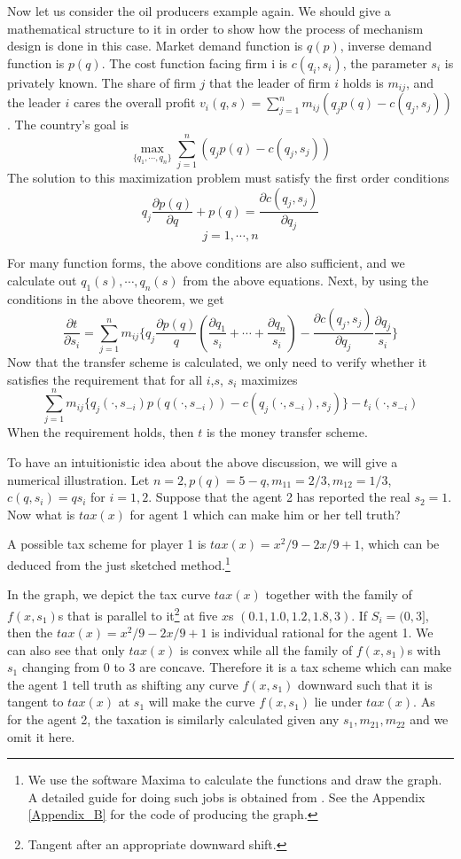 Now let us consider the oil producers example again. We should give a mathematical structure to it in order to show how the process of mechanism
design is done in this case. Market demand function is $q(p)$, inverse demand function is $p(q)$. The cost function 
facing firm i is $c(q_i,s_i)$, the parameter $s_i$ is privately known. The share of firm $j$
that the leader of firm  $i$ holds is $m_{ij}$, and  the leader $i$ cares the overall profit 
$v_i(q,s)=\sum_{j=1}^{n} m_{ij}(q_jp(q)-c(q_j,s_j))$. The country's goal is 
$$\max_{\{q_1,\cdots,q_n\}}\sum_{j=1}^{n} (q_jp(q)-c(q_j,s_j)) $$
The solution to this maximization problem must satisfy the first order conditions
$$q_j \frac {\partial p(q)}{\partial q}+p(q)=\frac {\partial c(q_j,s_j)}{\partial q_j}$$
$$j=1,\cdots,n$$

For many function forms, the above conditions are also sufficient, and we calculate out ${q_1(s),\cdots,q_n(s)}$ from the above 
equations. Next, by using the conditions in the above theorem, we get 
$$\frac{\partial t}{\partial s_i} = \sum_{j=1}^{n} m_{ij}\{q_j\frac {\partial p(q)}{q}(\frac{\partial q_1}{s_i}+\cdots+\frac{\partial q_n}{s_i})-\frac {\partial c(q_j,s_j)}{\partial q_j}\frac{\partial q_j}{s_i}\}$$
Now that the transfer scheme is calculated, we only need to verify whether it satisfies the requirement that for all $i$,$s$,  $s_i$ maximizes  
$$\sum_{j=1}^{n} m_{ij}\{q_j(\cdot,s_{-i})p(q(\cdot,s_{-i}))-c(q_j(\cdot,s_{-i}),s_j)\}-t_i(\cdot,s_{-i})$$
When the requirement holds, then $t$ is the money transfer scheme.

To have an intuitionistic idea about the above discussion, we will give a numerical illustration. Let $n=2,p(q)=5-q, m_{11}=2/3,m_{12}=1/3$, $c(q,s_i)=qs_i$ for $i=1,2$. Suppose that the agent 2 has reported the real $s_2=1$. Now what is $tax(x)$ for agent 1 which can make him or her tell truth?

A possible tax scheme for player 1 is $tax(x)=x^2/9 - 2x/9 + 1$, which can be deduced from the just sketched method.\footnote{We use the software Maxima to calculate the functions and draw the graph. A detailed guide for doing such jobs is obtained from \parencite{Maxima}.
  See the Appendix \ref{Appendix_B} for the code of producing the graph.}

In the graph, we depict the tax curve $tax(x)$ together with the family of $f(x,s_1)$s that is parallel to it\footnote{Tangent after an appropriate downward shift.} at five $x$s  $(0.1,1.0,1.2,1.8,3)$. If $S_i= (0,3]$, then the $tax(x)=x^2/9 - 2x/9 + 1$ is individual rational for the agent 1. We can also see that only $tax(x)$ is convex while all the family of $f(x,s_1)$s with $s_1$ changing from $0$ to $3$ are concave. Therefore it is a tax scheme which can make the agent 1 tell truth as shifting any curve $f(x,s_1)$ downward such that it is tangent to $tax(x)$ at $s_1$ will make the curve  $f(x,s_1)$ lie under $tax(x)$. As for the agent 2, the taxation is similarly calculated given any $s_1, m_{21},m_{22}$ and we omit it here.



